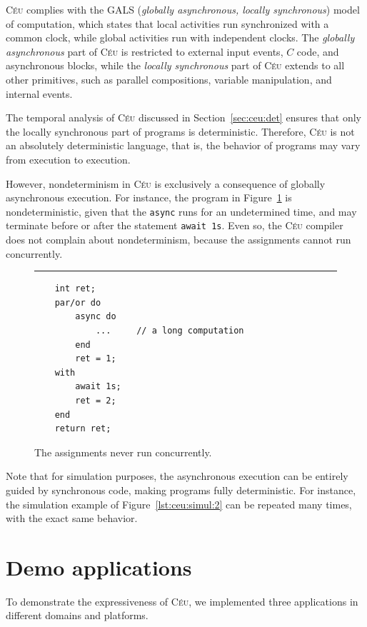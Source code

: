 \documentclass{sigplan-proc}
\newcommand{\2}{\;\;}
\newcommand{\5}{\;\;\;\;\;}
\newcommand{\CEU}{\textsc{C\'{e}u}}
\newcommand{\code}[1] {{\small{\texttt{#1}}}}
\begin{document}
\CEU{} complies with the GALS (\emph{globally asynchronous, locally 
synchronous}) model of computation, which states that local activities run 
synchronized with a common clock, while global activities run with independent 
clocks.
The \emph{globally asynchronous} part of \CEU{} is restricted to external input 
events, $C$ code, and asynchronous blocks, while the \emph{locally synchronous} 
part of \CEU{} extends to all other primitives, such as parallel compositions, 
variable manipulation, and internal events.

The temporal analysis of \CEU{} discussed in Section~\ref{sec:ceu:det} ensures 
that only the locally synchronous part of programs is deterministic.
Therefore, \CEU{} is not an absolutely deterministic language, that is, the 
behavior of programs may vary from execution to execution.

However, nondeterminism in \CEU{} is exclusively a consequence of globally 
asynchronous execution.
For instance, the program in Figure~\ref{lst:ceu:gals} is nondeterministic, 
given that the \code{async} runs for an undetermined time, and may terminate 
before or after the statement \code{await~1s}.
Even so, the \CEU{} compiler does not complain about nondeterminism, because 
the assignments cannot run concurrently.

\begin{figure}[t]
\rule{8.5cm}{0.37pt}
{\small
\begin{verbatim}
    int ret;
    par/or do
        async do
            ...     // a long computation
        end
        ret = 1;
    with
        await 1s;
        ret = 2;
    end
    return ret;
\end{verbatim}
}
\caption{ The assignments never run concurrently.
\label{lst:ceu:gals}
}
\end{figure}

Note that for simulation purposes, the asynchronous execution can be entirely 
guided by synchronous code, making programs fully deterministic.
For instance, the simulation example of Figure~\ref{lst:ceu:simul:2} can be 
repeated many times, with the exact same behavior.

\section{Demo applications}
\label{sec:demos}

To demonstrate the expressiveness of \CEU{}, we implemented three applications 
in different domains and platforms.
\end{document}
